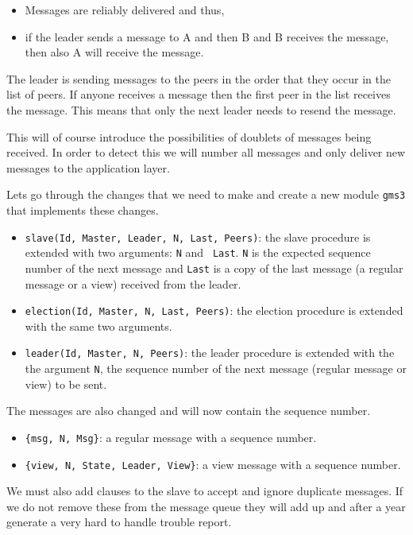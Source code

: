 \documentclass[a4paper,11pt]{article}
\begin{document}
\begin{itemize}
\item Messages are reliably delivered and thus,
\item if the leader sends a message to A and then B and B receives the
  message, then also A will receive the message.
\end{itemize}

The leader is sending messages to the peers in the order that they
occur in the list of peers. If anyone receives a message then the
first peer in the list receives the message. This means that only the
next leader needs to resend the message.

This will of course introduce the possibilities of doublets of
messages being received. In order to detect this we will number all
messages and only deliver new messages to the application layer.

Lets go through the changes that we need to make and create a new
module {\tt gms3} that implements these changes.

\begin{itemize}
\item {\tt slave(Id, Master, Leader, N, Last, Peers)}: the slave
  procedure is extended with two arguments: {\tt N} and {\tt
    Last}. {\tt N} is the expected sequence number of the next message
  and {\tt Last} is a copy of the last message (a regular message or a
  view) received from the leader.
\item {\tt election(Id, Master, N, Last, Peers)}: the election
  procedure is extended with the same two arguments.
\item {\tt leader(Id, Master, N, Peers)}: the leader procedure is
  extended with the the argument {\tt N}, the sequence number of the
  next message (regular message or view) to be sent.
\end{itemize}

The messages are also changed and will now contain the sequence number.

\begin{itemize}
\item {\tt \{msg, N, Msg\}}: a regular message with a sequence number.
\item {\tt \{view, N, State, Leader, View\}}: a view message with a sequence number.
\end{itemize}

We must also add clauses to the slave to accept and ignore duplicate
messages. If we do not remove these from the message queue they will
add up and after a year generate a very hard to handle trouble report.
\end{document}
